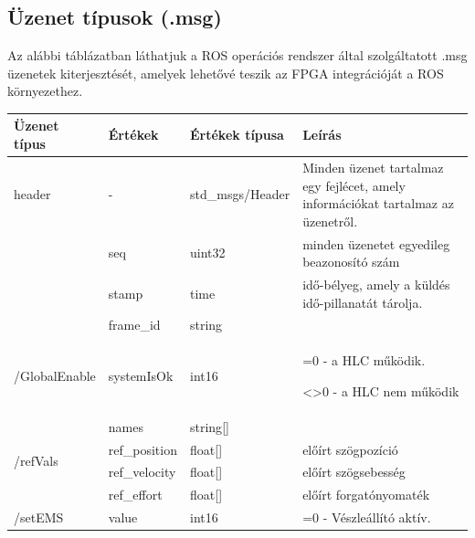 \subsection{Üzenet típusok (.msg)}
Az alábbi táblázatban láthatjuk a ROS operációs rendszer által szolgáltatott .msg üzenetek kiterjesztését, amelyek lehetővé teszik az FPGA integrációját a ROS környezethez.
\begin{table}[H]
\centering
\begin{tabular}{lllp{6cm}}
\hline \textbf{Üzenet típus}              & \textbf{Értékek}   & \textbf{Értékek típusa} & \textbf{Leírás} \\ \hline
 header                   &     -     &      std\_msgs/Header      &   Minden üzenet tartalmaz egy fejlécet, amely információkat tartalmaz az üzenetről. \\   
                          & seq       &      uint32        &   minden üzenetet egyedileg beazonosító szám     \\
                          & stamp     &      time        &  idő-bélyeg, amely a küldés idő-pillanatát tárolja.      \\
                          & frame\_id  &      string        &        \\  \hline
                          
\hline  \multirow{1}{*}{/GlobalEnable}  &   systemIsOk        &    int16          &    
                                                                          =0 - a HLC működik.
                                                                          
                                                                          <>0 -  a HLC nem működik      \\    \hline                    
\hline\multirow{4}{*}{/refVals} & names     & string{[}{]} &        \\
                          & ref\_position  & float{[}{]}  & előírt szögpozíció       \\
                          & ref\_velocity & float{[}{]}  &  előírt szögsebesség      \\ 
                          & ref\_effort &    float{[}{]}  &  előírt forgatónyomaték    \\\hline
 \hline \multirow{1}{*}{/setEMS}  &   value        &     int16         &      =0 - Vészleállító aktív.
                                                                          

\end{tabular}
\end{table}
